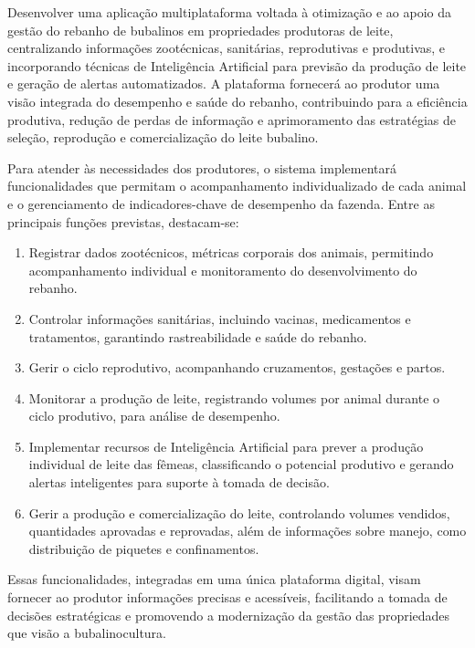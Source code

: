 Desenvolver uma aplicação multiplataforma voltada à otimização e ao apoio da gestão do rebanho de bubalinos em propriedades produtoras de leite, centralizando informações zootécnicas, sanitárias, reprodutivas e produtivas, e incorporando técnicas de Inteligência Artificial para previsão da produção de leite e geração de alertas automatizados. A plataforma fornecerá ao produtor uma visão integrada do desempenho e saúde do rebanho, contribuindo para a eficiência produtiva, redução de perdas de informação e aprimoramento das estratégias de seleção, reprodução e comercialização do leite bubalino.

Para atender às necessidades dos produtores, o sistema implementará funcionalidades que permitam o acompanhamento individualizado de cada animal e o gerenciamento de indicadores-chave de desempenho da fazenda. Entre as principais funções previstas, destacam-se:

\begin{enumerate}
    \item Registrar dados zootécnicos, métricas corporais dos animais, permitindo acompanhamento individual e monitoramento do desenvolvimento do rebanho.
    \item Controlar informações sanitárias, incluindo vacinas, medicamentos e tratamentos, garantindo rastreabilidade e saúde do rebanho.
    \item Gerir o ciclo reprodutivo, acompanhando cruzamentos, gestações e partos.
    \item Monitorar a produção de leite, registrando volumes por animal durante o ciclo produtivo, para análise de desempenho.
    \item Implementar recursos de Inteligência Artificial para prever a produção individual de leite das fêmeas, classificando o potencial produtivo e gerando alertas inteligentes para suporte à tomada de decisão.
    \item Gerir a produção e comercialização do leite, controlando volumes vendidos, quantidades aprovadas e reprovadas, além de informações sobre manejo, como distribuição de piquetes e confinamentos.
\end{enumerate}


Essas funcionalidades, integradas em uma única plataforma digital, visam fornecer ao produtor informações precisas e acessíveis, facilitando a tomada de decisões estratégicas e promovendo a modernização da gestão das propriedades que visão a bubalinocultura.